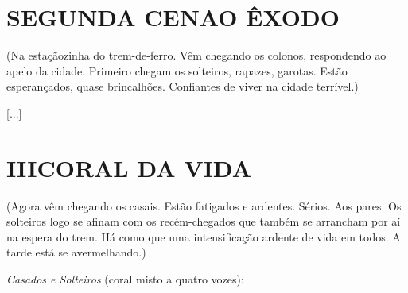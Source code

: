 \pagebreak

\section{SEGUNDA CENA\break O ÊXODO}

\hfill\parbox{150pt}{
(Na estaçãozinha do trem-de-ferro. Vêm chegando os colonos, respondendo
ao apelo da cidade. Primeiro chegam os solteiros, rapazes, garotas.
Estão esperançados, quase brincalhões. Confiantes de viver na cidade
terrível.)
}

{[}...{]}

\section{III\break CORAL DA VIDA}

\hfill\parbox{150pt}{
(Agora vêm chegando os casais. Estão fatigados e ardentes. Sérios. Aos
pares. Os solteiros logo se afinam com os recém-chegados que também se
arrancham por aí na espera do trem. Há como que uma intensificação
ardente de vida em todos. A tarde está se avermelhando.)
}

\emph{Casados e Solteiros} (coral misto a quatro vozes):

